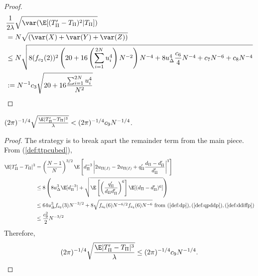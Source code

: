 \begin{proof}
  \begin{align*}
    &\frac{1}{2\lambda} \sqrt{\var (\E [(T_{\Pi}'-T_{\Pi})^2|T_{\Pi}])} \\
    &= N \sqrt{(\var(X) + \var(Y) + \var(Z))} \\
    &\leq N \sqrt{
      8(f_{c_2}(2))^2 \left ( 20 + 16 \left ( \sum_{i=1}^{2N} u_{i}^4 \right )N^{-2} \right ) N^{-4} 
      + 8u_{\Delta}^4 \frac{c_6}{4} N^{-4}
      + c_7 N^{-6} + c_8 N^{-4}} \\
    &:= N^{-1} c_3\sqrt{20 + 16\frac{\sum_{i=1}^{2N} u_{i}^4}{N^2}} \\
  \end{align*}
\end{proof}

\begin{proposition}
  \label{P:P3}
  $(2\pi)^{-1/4}\sqrt{\frac{\E|T_{\Pi}'-T_{\Pi}|^3}{\lambda}} 
  < (2\pi)^{-1/4} c_9 N^{-1/4}$.
\end{proposition}
\begin{proof}
  The strategy is to break apart the remainder term from the main piece.  From (\ref{def:ttpcubed}),
  \begin{align*}
    \E|T_{\Pi}'-T_{\Pi}|^3 
    &= \left (\frac{N-1}{N}\right )^{3/2}
    \E \left [d_{\Pi}^{-3} \left |2u_{\Pi(J)}-2u_{\Pi(I)}+q_{\Pi}'\frac{d_{\Pi}-d_{\Pi}'}{d_{\Pi}'} \right |^3
    \right ] \\
    &\leq 8 \left (
      8 u_{\Delta}^3 \E [d_{\Pi}^{-3}] + 
      \sqrt{\E \left [ \left ( \frac{q_{\Pi}'}{d_{\Pi}d_{\Pi}'} \right )^6 \right ]  \E
        [(d_{\Pi}-d_{\Pi}')^6]} \right ) \\    
    &\leq 64 u_{\Delta}^3 f_{c_2}(3) N^{-3/2} + 
    8 \sqrt{f_{c_6}(6) N^{-6/2} f_{c_4}(6) N^{-6}} \text{ from } 
    (\ref{def:dp}),(\ref{def:qpddp}),(\ref{def:ddiffp}) \\
    &\leq \frac{c_9^2}{2} N^{-3/2}
  \end{align*}
  Therefore, 
  \begin{equation*}
    (2\pi)^{-1/4}\sqrt{\frac{\E|T_{\Pi}'-T_{\Pi}|^3}{\lambda}} \leq
    (2\pi)^{-1/4} c_9 N^{-1/4}.
  \end{equation*}
\end{proof}

